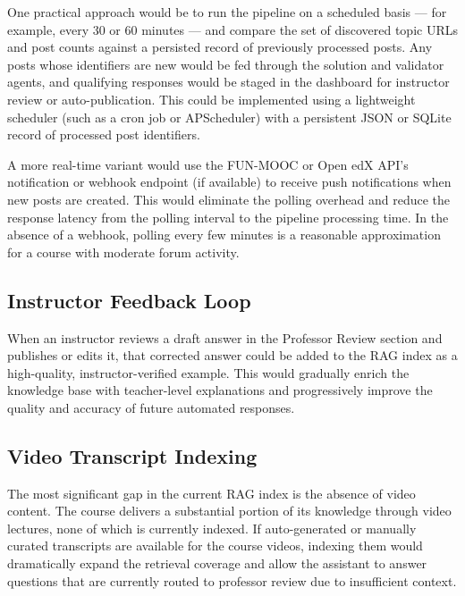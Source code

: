 \documentclass[12pt, a4paper]{article}
\begin{document}
One practical approach would be to run the pipeline on a scheduled basis --- for example, every 30 or 60 minutes --- and compare the set of discovered topic URLs and post counts against a persisted record of previously processed posts. Any posts whose identifiers are new would be fed through the solution and validator agents, and qualifying responses would be staged in the dashboard for instructor review or auto-publication. This could be implemented using a lightweight scheduler (such as a cron job or APScheduler) with a persistent JSON or SQLite record of processed post identifiers.

A more real-time variant would use the FUN-MOOC or Open edX API's notification or webhook endpoint (if available) to receive push notifications when new posts are created. This would eliminate the polling overhead and reduce the response latency from the polling interval to the pipeline processing time. In the absence of a webhook, polling every few minutes is a reasonable approximation for a course with moderate forum activity.

\subsection{Instructor Feedback Loop}

When an instructor reviews a draft answer in the Professor Review section and publishes or edits it, that corrected answer could be added to the RAG index \cite{lewis2020rag} as a high-quality, instructor-verified example. This would gradually enrich the knowledge base with teacher-level explanations and progressively improve the quality and accuracy of future automated responses.

\subsection{Video Transcript Indexing}

The most significant gap in the current RAG index is the absence of video content. The course delivers a substantial portion of its knowledge through video lectures, none of which is currently indexed. If auto-generated or manually curated transcripts are available for the course videos, indexing them would dramatically expand the retrieval coverage and allow the assistant to answer questions that are currently routed to professor review due to insufficient context.

\end{document}
